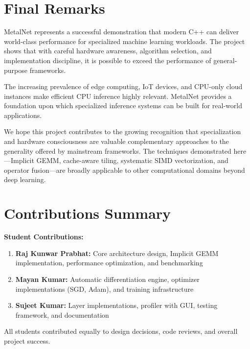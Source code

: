 \documentclass[12pt,oneside,a4paper]{report}
\begin{document}
\section{Final Remarks}

MetalNet represents a successful demonstration that modern C++ can deliver world-class performance for specialized machine learning workloads. The project shows that with careful hardware awareness, algorithm selection, and implementation discipline, it is possible to exceed the performance of general-purpose frameworks.

The increasing prevalence of edge computing, IoT devices, and CPU-only cloud instances make efficient CPU inference highly relevant. MetalNet provides a foundation upon which specialized inference systems can be built for real-world applications.

We hope this project contributes to the growing recognition that specialization and hardware consciousness are valuable complementary approaches to the generality offered by mainstream frameworks. The techniques demonstrated here—Implicit GEMM, cache-aware tiling, systematic SIMD vectorization, and operator fusion—are broadly applicable to other computational domains beyond deep learning.

\section{Contributions Summary}

\textbf{Student Contributions:}

\begin{enumerate}
    \item \textbf{Raj Kunwar Prabhat:} Core architecture design, Implicit GEMM implementation, performance optimization, and benchmarking
    \item \textbf{Mayan Kumar:} Automatic differentiation engine, optimizer implementations (SGD, Adam), and training infrastructure
    \item \textbf{Sujeet Kumar:} Layer implementations, profiler with GUI, testing framework, and documentation
\end{enumerate}

All students contributed equally to design decisions, code reviews, and overall project success.

\newpage
\end{document}
